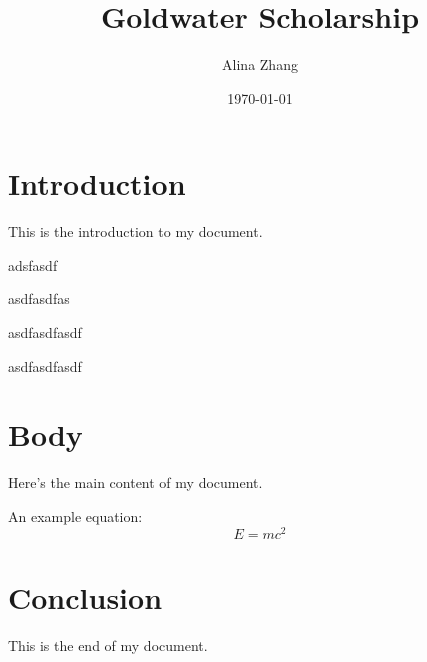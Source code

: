 \documentclass[12pt]{article}
\title{Goldwater Scholarship}
\author{Alina Zhang}
\date{\today}           %
\begin{document}
\maketitle              %

\section{Introduction}
This is the introduction to my document.


adsfasdf


asdfasdfas


asdfasdfasdf


asdfasdfasdf


\section{Body}

Here's the main content of my document. 

An example equation:
\begin{equation}
    E = mc^2
\end{equation}

\section{Conclusion}
This is the end of my document.
\end{document}
